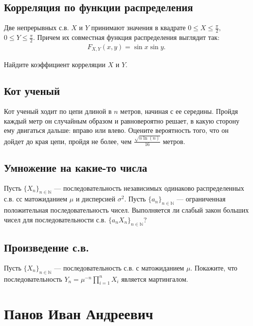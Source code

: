 \documentclass[12pt]{article}
\newcommand\N{\mathbb{N}}
\begin{document}
\subsection{Корреляция по функции распределения}

Две непрерывных с.в. $X$ и $Y$ принимают значения в квадрате $0 \le X \le \frac{\pi}{2},$ $0 \le Y \le \frac{\pi}{2}$. Причем их совместная функция распределения выглядит так:
\begin{align*}
    F_{X, Y} (x, y) = \sin x \sin y.
\end{align*}

Найдите коэффициент корреляции $X$ и $Y$.



\subsection{Кот ученый}

Кот ученый ходит по цепи длиной в $n$ метров, начиная с ее середины. Пройдя каждый метр он случайным образом и равновероятно решает, в какую сторону ему двигаться дальше: вправо или влево. Оцените вероятность того, что он дойдет до края цепи, пройдя не более, чем $\frac{\sqrt{n \ln(n)}}{16}$ метров.



\subsection{Умножение на какие-то числа}

Пусть $\{X_n\}_{n \in \N}$ --- последовательность независимых одинаково распределенных с.в. сс матожиданием $\mu$ и дисперсией $\sigma^2$. Пусть $\{a_n\}_{n \in \N}$ --- ограниченная положительная последовательность чисел. Выполняется ли слабый закон больших чисел для последовательности с.в. $\{a_n X_n\}_{n \in \N}$?



\subsection{Произведение с.в.}

Пусть $\{X_n\}_{n \in \N}$ --- последовательность с.в. с матожиданием $\mu$. Покажите, что последовательность $Y_n = \mu^{-n} \prod_{i = 1}^n X_i$ является мартингалом.



\newpage
\section{Панов Иван Андреевич}
\end{document}
